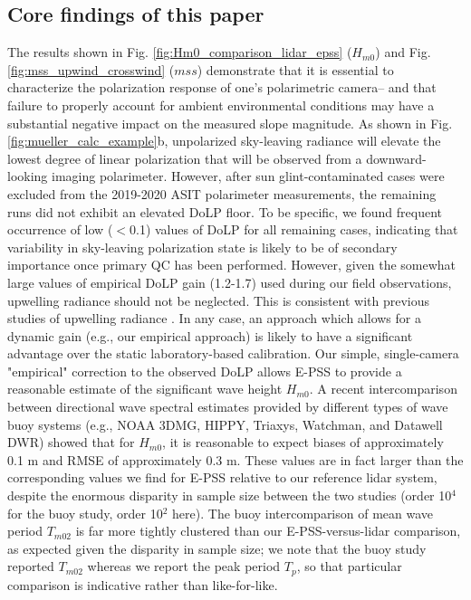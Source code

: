 \documentclass[letterpaper,draftcls,onecolumn]{IEEEtran}
\begin{document}
\subsection{Core findings of this paper}

The results shown in Fig. \ref{fig:Hm0_comparison_lidar_epss} ($H_{m0}$) and Fig. \ref{fig:mss_upwind_crosswind} ($mss$) demonstrate that it is essential to characterize the polarization response of one's polarimetric camera-- and that failure to properly account for ambient environmental conditions may have a substantial negative impact on the measured slope magnitude. As shown in Fig. \ref{fig:mueller_calc_example}b, unpolarized sky-leaving radiance will elevate the lowest degree of linear polarization that will be observed from a downward-looking imaging polarimeter. However, after sun glint-contaminated cases were excluded from the 2019-2020 ASIT polarimeter measurements, the remaining runs did not exhibit an elevated DoLP floor. To be specific, we found frequent occurrence of low ($<$0.1) values of DoLP for all remaining cases, indicating that variability in sky-leaving polarization state is likely to be of secondary importance once primary QC has been performed. However, given the somewhat large values of empirical DoLP gain (1.2-1.7) used during our field observations, upwelling radiance should not be neglected. This is consistent with previous studies of upwelling radiance \cite{You2011,ibrahim_relationship_2012}. In any case, an approach which allows for a dynamic gain (e.g., our empirical approach) is likely to have a significant advantage over the static laboratory-based calibration. Our simple, single-camera "empirical" correction to the observed DoLP allows E-PSS to provide a reasonable estimate of the significant wave height $H_{m0}$. A recent intercomparison \cite{jensen_quantifying_2021} between directional wave spectral estimates provided by different types of wave buoy systems (e.g., NOAA 3DMG, HIPPY, Triaxys, Watchman, and Datawell DWR) showed that for $H_{m0}$, it is reasonable to expect biases of approximately 0.1 m and RMSE of approximately 0.3 m. These values are in fact larger than the corresponding values we find for E-PSS relative to our reference lidar system, despite the enormous disparity in sample size between the two studies (order 10$^4$ for the buoy study, order 10$^2$ here). The buoy intercomparison of mean wave period $T_{m02}$ is far more tightly clustered than our E-PSS-versus-lidar comparison, as expected given the disparity in sample size; we note that the buoy study reported $T_{m02}$ whereas we report the peak period $T_p$, so that particular comparison is indicative rather than like-for-like.
\end{document}
